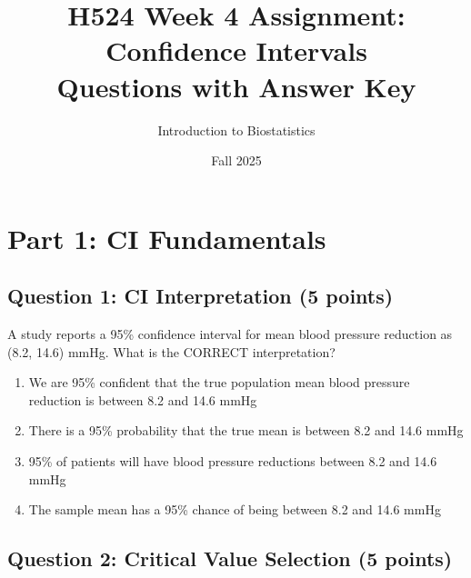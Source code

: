 \documentclass[11pt]{article}
\title{\textbf{\Large H524 Week 4 Assignment: Confidence Intervals}\\
\large Questions with Answer Key}
\author{Introduction to Biostatistics}
\date{Fall 2025}
\begin{document}
\maketitle

\begin{center}
\end{center}

\vspace{1em}

\section*{Part 1: CI Fundamentals}

\subsection*{Question 1: CI Interpretation (5 points)}

A study reports a 95\% confidence interval for mean blood pressure reduction as (8.2, 14.6) mmHg. What is the CORRECT interpretation?

\begin{enumerate}[label=\alph*)]
\item We are 95\% confident that the true population mean blood pressure reduction is between 8.2 and 14.6 mmHg
\item There is a 95\% probability that the true mean is between 8.2 and 14.6 mmHg
\item 95\% of patients will have blood pressure reductions between 8.2 and 14.6 mmHg
\item The sample mean has a 95\% chance of being between 8.2 and 14.6 mmHg
\end{enumerate}

\subsection*{Question 2: Critical Value Selection (5 points)}
\end{document}
